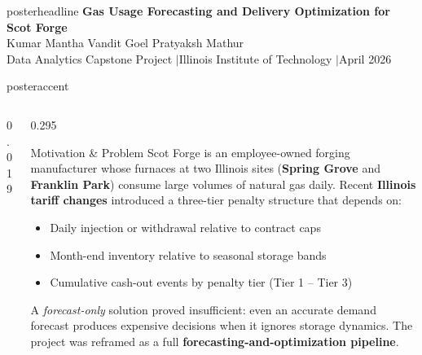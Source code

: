 \documentclass[final]{beamer}
\begin{document}
\begin{frame}[t]{}

\begin{beamercolorbox}[wd=\paperwidth, ht=13.5cm, sep=0cm]{posterheadline}
  \vspace{1.0cm}
  \centering
  {\fontsize{56}{62}\selectfont\bfseries
    Gas Usage Forecasting and Delivery Optimization for Scot Forge}\\[0.7cm]
  {\fontsize{30}{34}\selectfont
    Kumar Mantha \quad\textbullet\quad Vandit Goel \quad\textbullet\quad Pratyaksh Mathur}\\[0.5cm]
  {\fontsize{22}{26}\selectfont\color{lightblue}
    Data Analytics Capstone Project
    \quad$|$\quad Illinois Institute of Technology
    \quad$|$\quad April 2026}
\end{beamercolorbox}

\begin{beamercolorbox}[wd=\paperwidth, ht=0.55cm]{posteraccent}
\end{beamercolorbox}

\vspace{0.9cm}

\begin{columns}[T]

  \begin{column}{0.019\paperwidth}\end{column}

  \begin{column}{0.295\paperwidth}

    \begin{pbox}{Motivation \& Problem}
      \small
      Scot Forge is an employee-owned forging manufacturer whose furnaces at
      two Illinois sites (\textbf{Spring Grove} and \textbf{Franklin Park})
      consume large volumes of natural gas daily. Recent \textbf{Illinois tariff
      changes} introduced a three-tier penalty structure that depends on:
      \begin{itemize}
        \item Daily injection or withdrawal relative to contract caps
        \item Month-end inventory relative to seasonal storage bands
        \item Cumulative cash-out events by penalty tier (Tier 1 – Tier 3)
      \end{itemize}
      A \emph{forecast-only} solution proved insufficient: even an accurate
      demand forecast produces expensive decisions when it ignores storage
      dynamics. The project was reframed as a full
      \textbf{forecasting-and-optimization pipeline}.
    \end{pbox}


\end{column}
\end{columns}
\end{frame}
\end{document}
